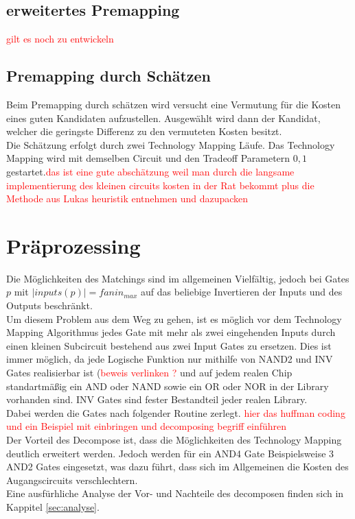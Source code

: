 \documentclass[11pt, a4paper, german]{article}
\newcommand{\TM}{Technology Mapping }
\begin{document}
 
\subsection{erweitertes Premapping}
\label{subsec:erweitertes_premapping}
\textcolor{red}{gilt es noch zu entwickeln} 
 
 
\subsection{Premapping durch Schätzen}
\label{subsec:neinhierfrnochkeinlabel}
 Beim Premapping durch schätzen wird versucht eine Vermutung für die Kosten eines guten Kandidaten aufzustellen. Ausgewählt wird dann der Kandidat, welcher die geringste Differenz zu den vermuteten Kosten besitzt.\\
 Die Schätzung erfolgt durch zwei \TM Läufe. Das \TM wird mit demselben Circuit  und den Tradeoff Parametern $0,1$ gestartet.\textcolor{red}{das ist eine gute abschätzung weil man durch die langsame implementierung des kleinen circuits kosten in der Rat bekommt plus die Methode aus Lukas heuristik entnehmen und dazupacken}


\section{Präprozessing}
Die Möglichkeiten des Matchings sind im allgemeinen Vielfältig, jedoch bei Gates $p$ mit $|inputs(p)| = fanin_{max}$ auf das beliebige Invertieren der Inputs und des Outputs beschränkt. \\
Um diesem Problem aus dem Weg zu gehen, ist es möglich vor dem \TM Algorithmus jedes Gate mit mehr als zwei eingehenden Inputs durch einen kleinen Subcircuit bestehend aus zwei Input Gates zu ersetzen. Dies ist immer möglich, da jede Logische Funktion nur mithilfe von NAND2 und INV Gates realisierbar ist (\textcolor{red}{beweis verlinken ?} und auf jedem realen Chip standartmäßig ein AND oder NAND sowie ein OR oder NOR in der Library vorhanden sind. INV Gates sind fester Bestandteil jeder realen Library.\\
Dabei werden die Gates nach folgender Routine zerlegt. \textcolor{red}{hier das huffman coding und ein Beispiel mit einbringen und decomposing begriff einführen}\\
Der Vorteil des Decompose ist, dass die Möglichkeiten des \TM deutlich erweitert werden. Jedoch werden für ein AND4 Gate Beispielsweise 3 AND2 Gates eingesetzt, was dazu führt, dass sich im Allgemeinen die Kosten des Augangscircuits verschlechtern.\\
Eine ausfürhliche Analyse der Vor- und Nachteile des decomposen finden sich in Kappitel \ref{sec:analyse}.
	
\end{document}
